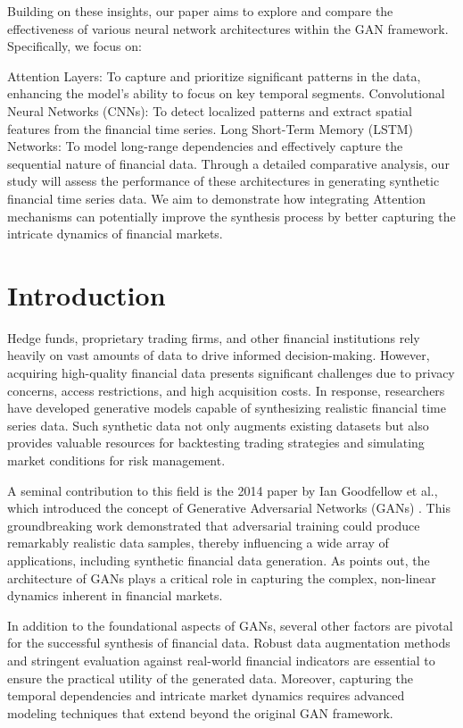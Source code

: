 \documentclass{article}
\begin{document}
Building on these insights, our paper aims to explore and compare the effectiveness of various neural network architectures within the GAN framework. Specifically, we focus on:

Attention Layers: To capture and prioritize significant patterns in the data, enhancing the model's ability to focus on key temporal segments.
Convolutional Neural Networks (CNNs): To detect localized patterns and extract spatial features from the financial time series.
Long Short-Term Memory (LSTM) Networks: To model long-range dependencies and effectively capture the sequential nature of financial data.
Through a detailed comparative analysis, our study will assess the performance of these architectures in generating synthetic financial time series data. We aim to demonstrate how integrating Attention mechanisms can potentially improve the synthesis process by better capturing the intricate dynamics of financial markets.

\section{Introduction}

Hedge funds, proprietary trading firms, and other financial institutions rely heavily on vast amounts of data to drive informed decision-making. However, acquiring high-quality financial data presents significant challenges due to privacy concerns, access restrictions, and high acquisition costs. In response, researchers have developed generative models capable of synthesizing realistic financial time series data. Such synthetic data not only augments existing datasets but also provides valuable resources for backtesting trading strategies and simulating market conditions for risk management.

A seminal contribution to this field is the 2014 paper by Ian Goodfellow et al., which introduced the concept of Generative Adversarial Networks (GANs) \textcite{Goodfellow2014GAN}. This groundbreaking work demonstrated that adversarial training could produce remarkably realistic data samples, thereby influencing a wide array of applications, including synthetic financial data generation. As \textcite{EckerliFlorian2021GANi} points out, the architecture of GANs plays a critical role in capturing the complex, non-linear dynamics inherent in financial markets.

In addition to the foundational aspects of GANs, several other factors are pivotal for the successful synthesis of financial data. Robust data augmentation methods and stringent evaluation against real-world financial indicators are essential to ensure the practical utility of the generated data. Moreover, capturing the temporal dependencies and intricate market dynamics requires advanced modeling techniques that extend beyond the original GAN framework.
\end{document}
